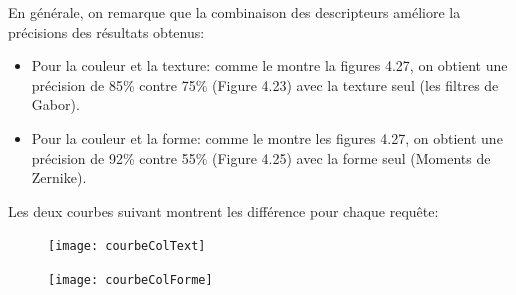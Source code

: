 
En générale, on remarque que la combinaison des descripteurs améliore la précisions des résultats obtenus:
\begin{itemize}
	\item Pour la couleur et la texture: comme le montre la figures 4.27, on obtient une précision de 85\% contre  75\% (Figure 4.23) avec la texture seul (les filtres de Gabor).
	\item Pour la couleur et la forme: comme le montre les figures 4.27, on obtient une précision de 92\% contre  55\% (Figure 4.25) avec la forme seul (Moments de Zernike).
\end{itemize}
Les deux courbes suivant montrent les différence pour chaque requête:
\begin{figure}[H]
	\centering
	\texttt{[image: courbeColText]}
\end{figure}
\begin{figure}[H]
	\centering
	\texttt{[image: courbeColForme]}
\end{figure}
